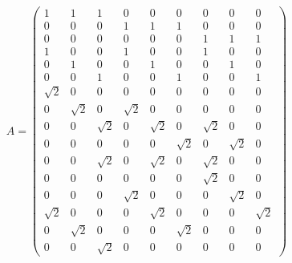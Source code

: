 \begin{equation}
	A=
	\begin{pmatrix}
    1 & 1 & 1 & 0 & 0 & 0 & 0 & 0 & 0 \\
    0 & 0 & 0 & 1 & 1 & 1 & 0 & 0 & 0 \\
    0 & 0 & 0 & 0 & 0 & 0 & 1 & 1 & 1 \\
    1 & 0 & 0 & 1 & 0 & 0 & 1 & 0 & 0 \\
    0 & 1 & 0 & 0 & 1 & 0 & 0 & 1 & 0 \\
    0 & 0 & 1 & 0 & 0 & 1 & 0 & 0 & 1 \\
    \sqrt{2} & 0 & 0 & 0 & 0 & 0 & 0 & 0 & 0 \\
    0 & \sqrt{2} & 0 & \sqrt{2} & 0 & 0 & 0 & 0 & 0 \\
    0 & 0 & \sqrt{2} & 0 & \sqrt{2} & 0 & \sqrt{2} & 0 & 0 \\
    0 & 0 & 0 & 0 & 0 & \sqrt{2} & 0 & \sqrt{2} & 0 \\
    0 & 0 & \sqrt{2} & 0 & \sqrt{2} & 0 & \sqrt{2} & 0 & 0 \\
    0 & 0 & 0 & 0 & 0 & 0 & \sqrt{2} & 0 & 0 \\
    0 & 0 & 0 & \sqrt{2} & 0 & 0 & 0 & \sqrt{2} & 0 \\
    \sqrt{2} & 0 & 0 & 0 & \sqrt{2} & 0 & 0 & 0 & \sqrt{2} \\
    0 & \sqrt{2} & 0 & 0 & 0 & \sqrt{2} & 0 & 0 & 0 \\
    0 & 0 & \sqrt{2} & 0 & 0 & 0 & 0 & 0 & 0
	\end{pmatrix}
\end{equation}


